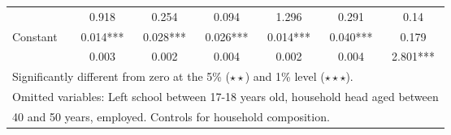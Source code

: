 \begin{table}
\begin{tabular}{l|ccc|ccc}
	&	       0.918   	&	0.254	&	0.094	&	       1.296   	&	0.291	&	0.14	\\				
Constant            	&	       0.014***	&	       0.028***	&	       0.026***	&	       0.014***	&	       0.040***	&	0.179	\\				
                    	&	       0.003   	&	0.002	&	0.004	&	       0.002   	&	0.004	&	       2.801***	\\
\hline\hline
\multicolumn{7}{l}{Significantly different from zero at the 5\% ($\star\star$) and 1\% level ($\star\star\star$).} \\
\multicolumn{7}{l}{Omitted variables: Left school between 17-18 years old, household head aged between} \\
\multicolumn{7}{l}{40 and 50 years, employed. Controls for household composition.}
\end{tabular}
\end{table}

